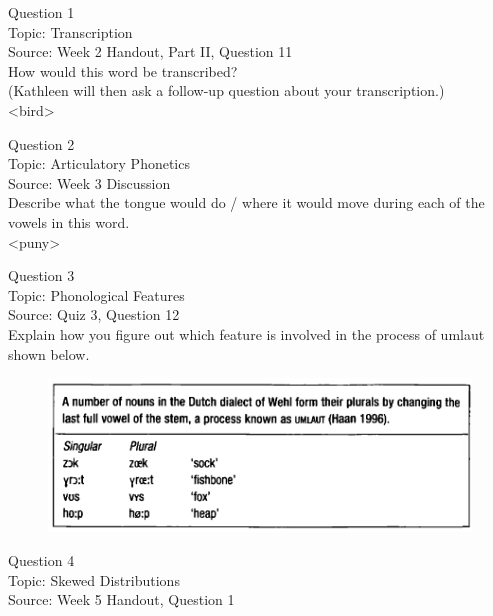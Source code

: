 \documentclass[12pt]{article}
\begin{document}
{\large Question 1}\\

Topic: Transcription\\
Source: Week 2 Handout, Part II, Question 11\\

How would this word be transcribed?\\ (Kathleen will then ask a follow-up question about your transcription.)\\

<bird>


\newpage

{\large Question 2}\\

Topic: Articulatory Phonetics\\
Source: Week 3 Discussion\\

Describe what the tongue would do / where it would move during each of the vowels in this word.\\

<puny>


\newpage

{\large Question 3}\\

Topic: Phonological Features\\
Source: Quiz 3, Question 12\\

Explain how you figure out which feature is involved in the process of umlaut shown below.\\

\begin{figure}[H]
\includegraphics{../images/dutch.png}
\end{figure}

\newpage

{\large Question 4}\\

Topic: Skewed Distributions\\
Source: Week 5 Handout, Question 1\\
\end{document}
